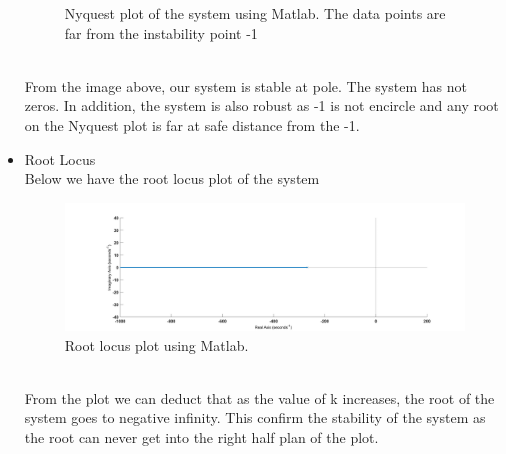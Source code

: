 \documentclass[12pt,letterpaper]{article}
\begin{document}
\begin{itemize}
\begin{figure}[h]
        \caption{Nyquest plot of the system using Matlab. The data points are far from the instability point -1 }
    \end{figure}\\
    From the image above, our system is stable at pole. The system has not zeros. 
    In addition, the system is also robust as -1 is not encircle and any root on the 
    Nyquest plot is far at safe distance from the -1. 
    \item Root Locus\\
    Below we have the root locus plot of the system
    \begin{figure}[h]
        \centering
        \includegraphics[width=15cm]{rlocus.jpg}
        \caption{Root locus plot using Matlab.}
    \end{figure}\\
    From the plot we can deduct that as the value of k increases, the root of the system 
    goes to negative infinity. This confirm the stability of the system as the root 
    can never get into the right half plan of the plot.
\end{itemize}
\end{document}
